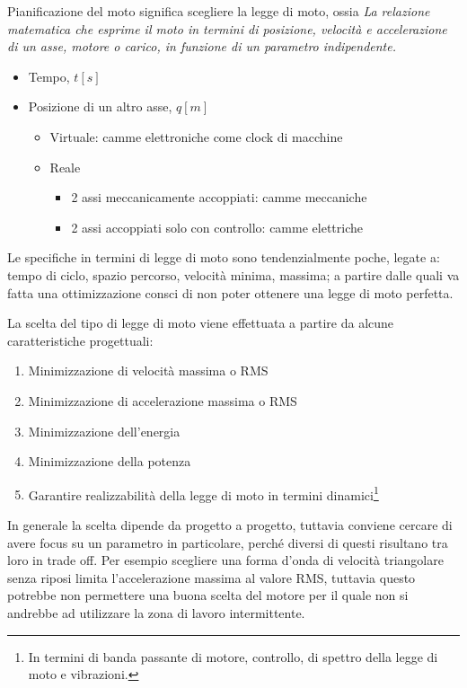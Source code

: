 Pianificazione del moto significa scegliere la legge di moto, ossia \textit{La relazione matematica che esprime il moto in termini di posizione, velocità e accelerazione di un asse, motore o carico, in funzione di un parametro indipendente.}
\begin{itemize}
    \item Tempo, \(t [s]\)
    \item Posizione di un altro asse, \(q [m]\)
    \begin{itemize}
        \item Virtuale: camme elettroniche come clock di macchine
        \item Reale
        \begin{itemize}
            \item 2 assi meccanicamente accoppiati: camme meccaniche
            \item 2 assi accoppiati solo con controllo: camme elettriche
        \end{itemize}
    \end{itemize}
\end{itemize}

Le specifiche in termini di legge di moto sono tendenzialmente poche, legate a: tempo di ciclo, spazio percorso, velocità minima, massima; a partire dalle quali va fatta una ottimizzazione consci di non poter ottenere una legge di moto perfetta.

La scelta del tipo di legge di moto viene effettuata a partire da alcune caratteristiche progettuali:
\begin{enumerate}
    \item Minimizzazione di velocità massima o RMS
    \item Minimizzazione di accelerazione massima o RMS
    \item Minimizzazione dell'energia
    \item Minimizzazione della potenza
    \item Garantire realizzabilità della legge di moto in termini dinamici\footnote{In termini di banda passante di motore, controllo, di spettro della legge di moto e vibrazioni.}
\end{enumerate}
In generale la scelta dipende da progetto a progetto, tuttavia conviene cercare di avere focus su un parametro in particolare, perché diversi di questi risultano tra loro in trade off. Per esempio scegliere una forma d'onda di velocità triangolare senza riposi limita l'accelerazione massima al valore RMS, tuttavia questo potrebbe non permettere una buona scelta del motore per il quale non si andrebbe ad utilizzare la zona di lavoro intermittente.

